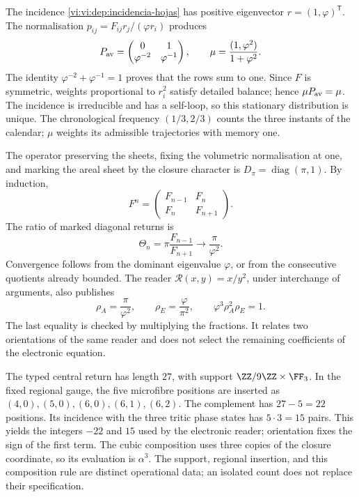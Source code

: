 The incidence \eqref{vi:vi:dep:incidencia-hojas} has positive eigenvector
\(r=(1,\varphi)^{\mathsf T}\). The normalisation
\(p_{ij}=F_{ij}r_j/(\varphi r_i)\) produces
\[
 P_{\rm av}=\begin{pmatrix}0&1\\\varphi^{-2}&\varphi^{-1}\end{pmatrix},
 \qquad \mu=\frac{(1,\varphi^2)}{1+\varphi^2}.
\]
The identity \(\varphi^{-2}+\varphi^{-1}=1\) proves that the rows
sum to one. Since \(F\) is symmetric, weights proportional to
\(r_i^2\) satisfy detailed balance; hence \(\mu P_{\rm av}=\mu\).
The incidence is irreducible and has a self-loop, so
this stationary distribution is unique. The chronological frequency
\((1/3,2/3)\) counts the three instants of the calendar; \(\mu\)
weights its admissible trajectories with memory one.

The operator preserving the sheets, fixing the volumetric normalisation
at one, and marking the areal sheet by the closure character is
\(D_\pi=\operatorname{diag}(\pi,1)\). By induction,
\[
 F^n=\begin{pmatrix}F_{n-1}&F_n\\F_n&F_{n+1}\end{pmatrix}.
\]
The ratio of marked diagonal returns is
\[
 \Theta_n=\pi\frac{F_{n-1}}{F_{n+1}}
 \longrightarrow\frac{\pi}{\varphi^2}.
\]
Convergence follows from the dominant eigenvalue \(\varphi\), or from
the consecutive quotients already bounded. The reader
\(\mathcal R(x,y)=x/y^2\), under interchange of arguments,
also publishes
\begin{equation}
 \rho_A=\frac{\pi}{\varphi^2},\qquad
 \rho_E=\frac{\varphi}{\pi^2},\qquad
 \varphi^3\rho_A^2\rho_E=1.
 \label{vi:vi:dep:dos-orientaciones}
\end{equation}
The last equality is checked by multiplying the fractions.
It relates two orientations of the same reader and does not select the
remaining coefficients of the electronic equation.

The typed central return has length \(27\), with support
\(\ZZ/9\ZZ\times\FF_3\). In the fixed regional gauge, the five microfibre
positions are inserted as
\((4,0),(5,0),(6,0),(6,1),(6,2)\).
The complement has \(27-5=22\) positions. Its incidence with the
three tritic phase states has \(5\cdot3=15\) pairs.
This yields the integers \(-22\) and \(15\) used by the
electronic reader; orientation fixes the sign of the first term.
The cubic composition uses three copies of the closure coordinate,
so its evaluation is \(\alpha^3\). The support, regional
insertion, and this composition rule are distinct operational data;
an isolated count does not replace their specification.

